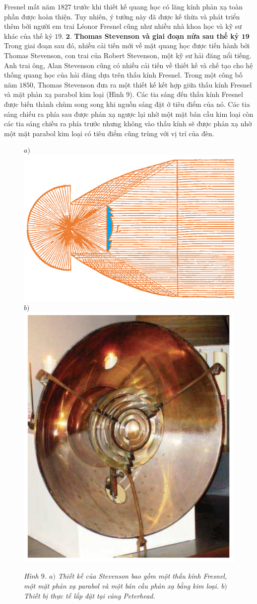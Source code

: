 \begin{multicols}{2}
\begin{figure}[H]
		\vspace*{-5pt}
	\end{figure}
	Fresnel mất năm $1827$ trước khi thiết kế quang học có lăng kính phản xạ toàn phần được hoàn thiện. Tuy nhiên, ý tưởng này đã được kế thừa và phát triển thêm bởi người em trai Léonor Fresnel cũng như nhiều nhà khoa học và kỹ sư khác của thế kỷ $19$.
	\vskip 0.1cm
	$\pmb{2.}$ \textbf{\color{timhieukhoahoc}Thomas Stevenson và giai đoạn nửa sau thế kỷ $\pmb{19}$}
	\vskip 0.1cm
	Trong giai đoạn sau đó, nhiều cải tiến mới về mặt quang học được tiến hành bởi Thomas Stevenson, con trai của Robert Stevenson, một kỹ sư hải đăng nổi tiếng. Anh trai ông, Alan Stevenson cũng có nhiều cải tiến về thiết kế và chế tạo cho hệ thống quang học của hải đăng dựa trên thấu kính Fresnel. Trong một công bố năm $1850$, Thomas Stevenson đưa ra một thiết kế kết hợp giữa thấu kính Fresnel và mặt phản xạ parabol kim loại (Hình $9$). Các tia sáng đến thấu kính Fresnel được biến thành chùm song song khi nguồn sáng đặt ở tiêu điểm của nó. Các tia sáng chiếu ra phía sau được phản xạ ngược lại nhờ một mặt bán cầu kim loại còn các tia sáng chiếu ra phía trước nhưng không vào thấu kính sẽ được phản xạ nhờ một mặt parabol kim loại có tiêu điểm cũng trùng với vị trí của đèn.
	\begin{figure}[H]
		\vspace*{-5pt}
		\centering
		\captionsetup{labelformat= empty, justification=centering}
		$a)$\includegraphics[height= 0.38\linewidth]{10}
		$b)$\includegraphics[height= 0.38\linewidth]{10b}
		\caption{\small\textit{\color{timhieukhoahoc}Hình $9$. $a)$ Thiết kế của Stevenson bao gồm một thấu kính Fresnel, một mặt phản xạ parabol và một bán cầu phản xạ bằng kim loại. $b)$ Thiết bị thực tế lắp đặt tại cảng Peterhead.}}

\end{figure}
\end{multicols}
